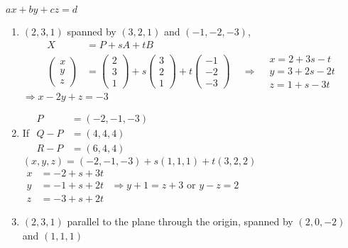 \documentclass[twoside]{amsart}
\theoremstyle{plain}
\theoremstyle{definition}
\newcommand{\exercisehead}[1]
  {\smallskip
   \noindent{\small\bf Exercise #1.}}
\begin{document}
\exercisehead{6} $ax + by +cz = d$
\begin{enumerate}
  \item $(2,3,1)$ spanned by $(3,2,1)$ and $(-1,-2,-3)$, 
\[
    \begin{aligned} 
    X & = P + sA + tB  \\
    \left( \begin{matrix} x \\ y \\ z \end{matrix} \right) & = \left( \begin{matrix} 2 \\ 3 \\ 1 \end{matrix} \right) + s \left( \begin{matrix} 3 \\ 2 \\ 1 \end{matrix} \right) + t \left( \begin{matrix} -1 \\ -2 \\ -3 \end{matrix} \right) \quad \, \Longrightarrow \begin{aligned}
      & x = 2 + 3s - t \\
      & y = 3 + 2s -2t \\
      & z = 1 + s - 3t 
\end{aligned}
    \end{aligned}
\]
$\Longrightarrow x - 2y + z = -3$ \\
\item If $\begin{aligned}
  P & = (-2,-1,-3) \\
  Q-P & = (4,4,4) \\
  R-P & = (6,4,4)
\end{aligned}$ \quad $(x,y,z) = (-2,-1,-3) + s(1,1,1) + t(3,2,2)$  \medskip \\
  $\begin{aligned}
  x & = -2 + s + 3t \\
  y & = -1 + s + 2t \\
  z & = -3 + s + 2t 
\end{aligned}$ \quad $\Longrightarrow  y + 1 = z +3$ or $y - z = 2$ 
\item $(2,3,1)$ parallel to the plane through the origin, spanned by $(2,0,-2)$ and $(1,1,1)$  
\[
\begin{gathered}
  \begin{aligned}

\end{aligned}
\end{gathered}\]
\end{enumerate}
\end{document}
